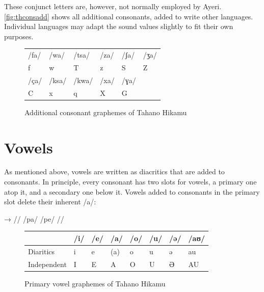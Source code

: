 \noindent These conjunct letters are, however, not normally employed by Ayeri. 
\autoref{fig:thconsadd} shows all additional consonants, added to write other 
languages. Individual languages may adapt the sound values slightly to fit their 
own purposes.

\begin{figure}[ht]
\caption{Additional consonant graphemes of Tahano Hikamu}

\begin{tabu} to \linewidth{X[c] X[c] X[c] X[c] X[c] X[c]}
\toprule
\tableheaderfont	/fa/ & /wa/ & /tsa/ & /za/ & /ʃa/ & /ʒa/ \\
\rowfont{\Tagati\huge}	f & w & T & z & S & Z \\

\midrule

\tableheaderfont	/ça/ & /ksa/ & /kwa/ & /xa/ & /ɣa/ \\
\rowfont{\Tagati\huge}	C & x & q & X & G \\

\bottomrule
\end{tabu}
\label{fig:thconsadd}
\end{figure}


\section{Vowels}

As mentioned above, vowels are written as diacritics that are added to 
consonants. In principle, every consonant has two slots for vowels, a primary 
one atop it, and a secondary one below it. Vowels added to consonants in 
the primary slot delete their inherent /a/:

\ex[lingstyle=thex]\begingl
	\gla {}	→	 //
	\glb /pa/	{}	/pe/ //
\endgl\xe

\begin{figure}[th]
\caption{Primary vowel graphemes of Tahano Hikamu}

\begin{tabu} to \linewidth{H[c] X[c] X[c] X[c] X[c] X[c] X[c] X[c]}
\toprule
\tableheaderfont

	& /i/
	& /e/
	& /a/
	& /o/
	& /u/
	& /ə/
	& /aʊ/
	\\
	
\toprule
	
Diaritics
	& \Tagati\huge *i
	& \Tagati\huge *e
	& \huge ({\Tagati *a})
	& \Tagati\huge *o
	& \Tagati\huge *u
	& \Tagati\huge *ə
	& \Tagati\huge *au
	\\

\midrule

Independent
	& \Tagati\huge I
	& \Tagati\huge E
	& \Tagati\huge A
	& \Tagati\huge O
	& \Tagati\huge U
	& \Tagati\huge Ə
	& \Tagati\huge AU
	\\

\bottomrule
\end{tabu}
\label{fig:thvowstop}
\end{figure}

